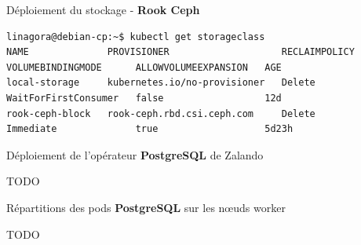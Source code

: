 \begin{frame}[fragile]{Déploiement du stockage - \textbf{Rook Ceph}}

\begin{tiny}
\begin{Verbatim}[commandchars=\\\{\}]
linagora@debian-cp:~$ kubectl get storageclass
NAME              PROVISIONER                    RECLAIMPOLICY   VOLUMEBINDINGMODE      ALLOWVOLUMEEXPANSION   AGE
local-storage     kubernetes.io/no-provisioner   Delete          WaitForFirstConsumer   false                  12d
rook-ceph-block   rook-ceph.rbd.csi.ceph.com     Delete          Immediate              true                   5d23h
\end{Verbatim}
\end{tiny}

\end{frame}


\begin{frame}[fragile]{Déploiement de l'opérateur \textbf{PostgreSQL} de Zalando}

TODO

\end{frame}


\begin{frame}[fragile]{Répartitions des pods \textbf{PostgreSQL} sur les n{\oe}uds worker}

TODO

\end{frame}

